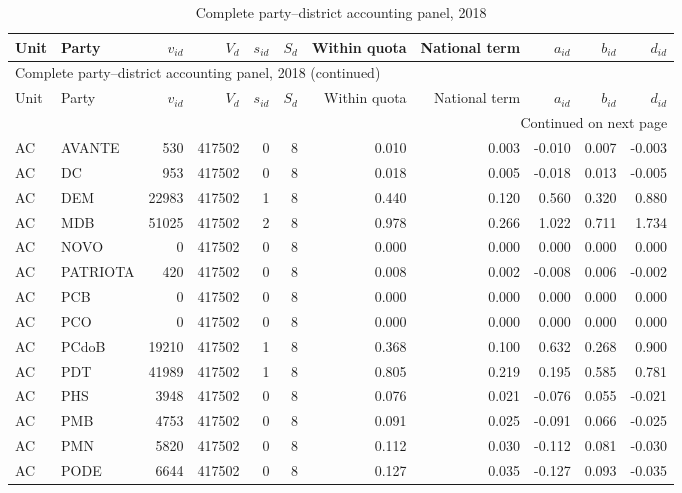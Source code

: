 \begin{landscape}
\begingroup
\tiny
\setlength{\tabcolsep}{3.2pt}
\begin{longtable}{llrrrrrrrrr}
\caption{Complete party--district accounting panel, 2018}\label{tab:intermediate-party-district-2018} \\
\toprule
Unit & Party & \(v_{id}\) & \(V_d\) & \(s_{id}\) & \(S_d\) & Within quota & National term & \(a_{id}\) & \(b_{id}\) & \(d_{id}\) \\
\midrule
\endfirsthead
\multicolumn{11}{l}{\footnotesize Complete party--district accounting panel, 2018 (continued)} \\
\toprule
Unit & Party & \(v_{id}\) & \(V_d\) & \(s_{id}\) & \(S_d\) & Within quota & National term & \(a_{id}\) & \(b_{id}\) & \(d_{id}\) \\
\midrule
\endhead
\midrule
\multicolumn{11}{r}{\footnotesize Continued on next page} \\
\endfoot
\bottomrule
\endlastfoot
AC & AVANTE & 530 & 417502 & 0 & 8 & 0.010 & 0.003 & -0.010 & 0.007 & -0.003 \\
AC & DC & 953 & 417502 & 0 & 8 & 0.018 & 0.005 & -0.018 & 0.013 & -0.005 \\
AC & DEM & 22983 & 417502 & 1 & 8 & 0.440 & 0.120 & 0.560 & 0.320 & 0.880 \\
AC & MDB & 51025 & 417502 & 2 & 8 & 0.978 & 0.266 & 1.022 & 0.711 & 1.734 \\
AC & NOVO & 0 & 417502 & 0 & 8 & 0.000 & 0.000 & 0.000 & 0.000 & 0.000 \\
AC & PATRIOTA & 420 & 417502 & 0 & 8 & 0.008 & 0.002 & -0.008 & 0.006 & -0.002 \\
AC & PCB & 0 & 417502 & 0 & 8 & 0.000 & 0.000 & 0.000 & 0.000 & 0.000 \\
AC & PCO & 0 & 417502 & 0 & 8 & 0.000 & 0.000 & 0.000 & 0.000 & 0.000 \\
AC & PCdoB & 19210 & 417502 & 1 & 8 & 0.368 & 0.100 & 0.632 & 0.268 & 0.900 \\
AC & PDT & 41989 & 417502 & 1 & 8 & 0.805 & 0.219 & 0.195 & 0.585 & 0.781 \\
AC & PHS & 3948 & 417502 & 0 & 8 & 0.076 & 0.021 & -0.076 & 0.055 & -0.021 \\
AC & PMB & 4753 & 417502 & 0 & 8 & 0.091 & 0.025 & -0.091 & 0.066 & -0.025 \\
AC & PMN & 5820 & 417502 & 0 & 8 & 0.112 & 0.030 & -0.112 & 0.081 & -0.030 \\
AC & PODE & 6644 & 417502 & 0 & 8 & 0.127 & 0.035 & -0.127 & 0.093 & -0.035 \\

\end{longtable}
\end{landscape}
